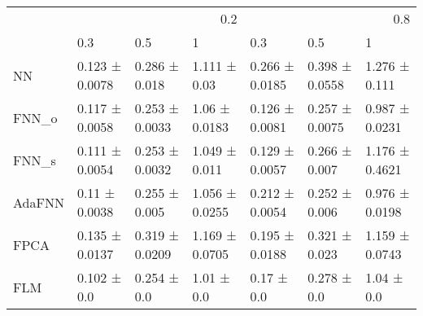 \begin{tabular}{lllllll}
\toprule
 & \multicolumn{3}{r}{0.2} & \multicolumn{3}{r}{0.8} \\
 & 0.3 & 0.5 & 1 & 0.3 & 0.5 & 1 \\
\midrule
NN & 0.123 ± 0.0078 & 0.286 ± 0.018 & 1.111 ± 0.03 & 0.266 ± 0.0185 & 0.398 ± 0.0558 & 1.276 ± 0.111 \\
FNN_o & 0.117 ± 0.0058 & 0.253 ± 0.0033 & 1.06 ± 0.0183 & 0.126 ± 0.0081 & 0.257 ± 0.0075 & 0.987 ± 0.0231 \\
FNN_s & 0.111 ± 0.0054 & 0.253 ± 0.0032 & 1.049 ± 0.011 & 0.129 ± 0.0057 & 0.266 ± 0.007 & 1.176 ± 0.4621 \\
AdaFNN & 0.11 ± 0.0038 & 0.255 ± 0.005 & 1.056 ± 0.0255 & 0.212 ± 0.0054 & 0.252 ± 0.006 & 0.976 ± 0.0198 \\
FPCA & 0.135 ± 0.0137 & 0.319 ± 0.0209 & 1.169 ± 0.0705 & 0.195 ± 0.0188 & 0.321 ± 0.023 & 1.159 ± 0.0743 \\
FLM & 0.102 ± 0.0 & 0.254 ± 0.0 & 1.01 ± 0.0 & 0.17 ± 0.0 & 0.278 ± 0.0 & 1.04 ± 0.0 \\
\bottomrule
\end{tabular}
